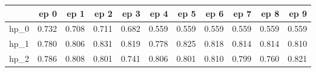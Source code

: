 \begin{tabular}{lrrrrrrrrrr}
\toprule
{} &   ep 0 &   ep 1 &   ep 2 &   ep 3 &   ep 4 &   ep 5 &   ep 6 &   ep 7 &   ep 8 &   ep 9 \\
\midrule
hp\_0 &  0.732 &  0.708 &  0.711 &  0.682 &  0.559 &  0.559 &  0.559 &  0.559 &  0.559 &  0.559 \\
hp\_1 &  0.780 &  0.806 &  0.831 &  0.819 &  0.778 &  0.825 &  0.818 &  0.814 &  0.814 &  0.810 \\
hp\_2 &  0.786 &  0.808 &  0.801 &  0.741 &  0.806 &  0.801 &  0.810 &  0.799 &  0.760 &  0.821 \\
\bottomrule
\end{tabular}
